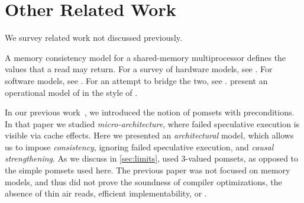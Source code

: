 \section{Other Related Work}\label{sec:related}
We survey related work not discussed previously.

A memory consistency model for a shared-memory multiprocessor defines the
values that a read may return.  For a survey of hardware models, see
\citep{AlglaveThesis}. For software models, see
\citep{DBLP:journals/toplas/Lochbihler13,DBLP:phd/ethos/Batty15}.  For an
attempt to bridge the two, see \citep{DBLP:journals/pacmpl/PodkopaevLV19}.
\citet{DBLP:conf/pldi/PultePKLH19} present an operational model of
\armeight{} in the style of \cite{DBLP:conf/popl/KangHLVD17}.

In our previous work~\cite{2019-sp}, we introduced the notion of pomsets with
preconditions.  In that paper we studied \emph{micro\hyp{}architecture},
where failed speculative execution is visible via cache effects.  Here we
presented an \emph{architectural} model, which allows us to impose
\emph{consistency}, ignoring failed speculative execution, and \emph{causal
  strengthening}.  As we  discuss in \textsection\ref{sec:limits},
\cite{2019-sp} used 3-valued pomsets, as opposed to the simple pomsets used
here.  The previous paper was not focused on memory models, and thus did not
prove the soundness of compiler optimizations, the absence of thin air reads,
efficient implementability, or \drfsc{}.


